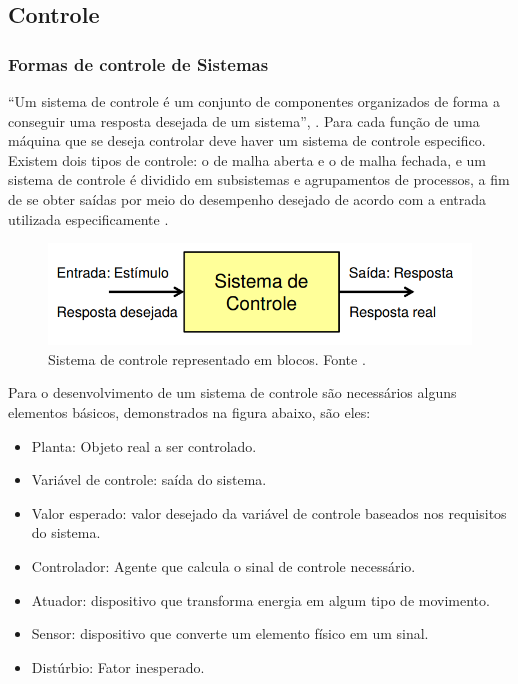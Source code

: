 	\subsection{Controle} %
	\label{sub:controle}

	\subsubsection{Formas de controle de Sistemas}

		“Um sistema de controle é um conjunto de componentes organizados de forma a conseguir uma resposta desejada de um sistema”, \cite{mello}. Para cada função de uma máquina que se deseja controlar deve haver um sistema de controle especifico. Existem dois tipos de controle: o de malha aberta e o de malha fechada, e um sistema de controle é dividido em subsistemas e agrupamentos de processos, a fim de se obter saídas por meio do desempenho desejado de acordo com a entrada utilizada especificamente \cite{mello}.

		\begin{figure}[H]
			\centering
			\includegraphics[scale=0.5]{figuras/sistema_controle.png}
			\caption{Sistema de controle representado em blocos. Fonte \cite{mello}.}
			\label{img:sistema_controle}
		\end{figure}

		Para o desenvolvimento de um sistema de controle são necessários alguns elementos básicos, demonstrados na figura abaixo, são eles:

		\begin{itemize}
			\item Planta: Objeto real a ser controlado.
			\item Variável de controle: saída do sistema.
			\item Valor esperado: valor desejado da variável de controle baseados nos requisitos do sistema.
			\item Controlador: Agente que calcula o sinal de controle necessário.
			\item Atuador: dispositivo que transforma energia em algum tipo de movimento.
			\item Sensor: dispositivo que converte um elemento físico em um sinal.
			\item Distúrbio: Fator inesperado.
		\end{itemize}

